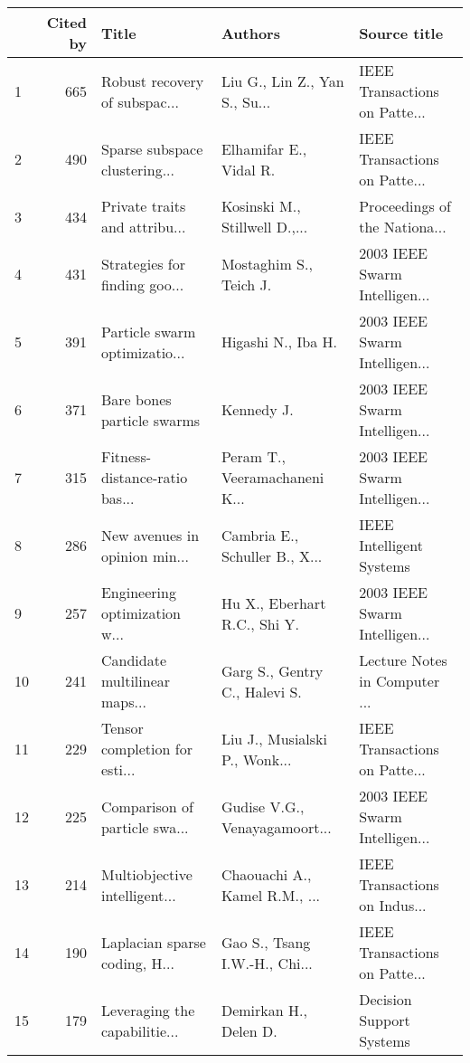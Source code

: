 \begin{tabular}{lrlll}
\toprule
{} &  Cited by &                          Title &                        Authors &                   Source title \\
\midrule
1  &       665 &  Robust recovery of subspac... &  Liu G., Lin Z., Yan S., Su... &  IEEE Transactions on Patte... \\
2  &       490 &  Sparse subspace clustering... &         Elhamifar E., Vidal R. &  IEEE Transactions on Patte... \\
3  &       434 &  Private traits and attribu... &  Kosinski M., Stillwell D.,... &  Proceedings of the Nationa... \\
4  &       431 &  Strategies for finding goo... &         Mostaghim S., Teich J. &  2003 IEEE Swarm Intelligen... \\
5  &       391 &  Particle swarm optimizatio... &             Higashi N., Iba H. &  2003 IEEE Swarm Intelligen... \\
6  &       371 &     Bare bones particle swarms &                     Kennedy J. &  2003 IEEE Swarm Intelligen... \\
7  &       315 &  Fitness-distance-ratio bas... &  Peram T., Veeramachaneni K... &  2003 IEEE Swarm Intelligen... \\
8  &       286 &  New avenues in opinion min... &  Cambria E., Schuller B., X... &       IEEE Intelligent Systems \\
9  &       257 &  Engineering optimization w... &   Hu X., Eberhart R.C., Shi Y. &  2003 IEEE Swarm Intelligen... \\
10 &       241 &  Candidate multilinear maps... &  Garg S., Gentry C., Halevi S. &  Lecture Notes in Computer ... \\
11 &       229 &  Tensor completion for esti... &  Liu J., Musialski P., Wonk... &  IEEE Transactions on Patte... \\
12 &       225 &  Comparison of particle swa... &  Gudise V.G., Venayagamoort... &  2003 IEEE Swarm Intelligen... \\
13 &       214 &  Multiobjective intelligent... &  Chaouachi A., Kamel R.M., ... &  IEEE Transactions on Indus... \\
14 &       190 &  Laplacian sparse coding, H... &  Gao S., Tsang I.W.-H., Chi... &  IEEE Transactions on Patte... \\
15 &       179 &  Leveraging the capabilitie... &          Demirkan H., Delen D. &       Decision Support Systems \\
\bottomrule
\end{tabular}
